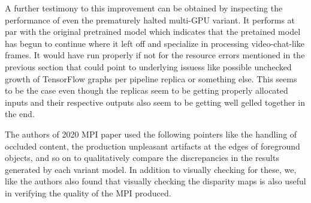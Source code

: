 A further testimony to this improvement can be obtained by inspecting the performance of even the prematurely halted multi-GPU variant. It performs at par with the original pretrained model which indicates that the pretained model has begun to continue where it left off and specialize in processing video-chat-like frames. It would have run properly if not for the resource errors mentioned in the previous section that could point to underlying issuess like possible unchecked growth of TensorFlow graphs per pipeline replica or something else. This seems to be the case even though the replicas seem to be getting properly allocated inputs and their respective outputs also seem to be getting well gelled together in the end.

The authors of 2020 MPI paper used the following pointers like the handling of occluded content, the production unpleasant artifacts at the edges of foreground objects, and so on to qualitatively compare the discrepancies in the results generated by each variant model. In addition to visually checking for these, we, like the authors also found that visually checking the disparity maps is also useful in verifying the quality of the MPI produced.   

